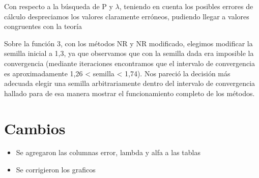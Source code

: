\documentclass[titlepage,a4paper]{article}
\begin{document}
Con respecto a la búsqueda de P y $\lambda$, teniendo en cuenta los posibles errores de cálculo despreciamos los valores claramente erróneos, pudiendo llegar a valores congruentes con la teoría

Sobre la función 3, con los métodos NR y NR modificado, elegimos modificar la semilla inicial a 1,3, ya que observamos que con la semilla dada era imposible la convergencia (mediante iteraciones encontramos que el intervalo de convergencia es aproximadamente 1,26 < semilla < 1,74). Nos pareció la decisión más adecuada elegir una semilla arbitrariamente dentro del intervalo de convergencia hallado para de esa manera mostrar el funcionamiento completo de los métodos.

\section{Cambios}\label{sec:cambios}
    \begin{itemize}
        \item Se agregaron las columnas error, lambda y alfa a las tablas
        \item Se corrigieron los graficos
    \end{itemize}
\end{document}
